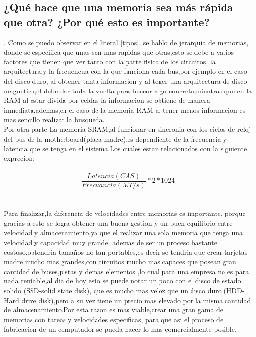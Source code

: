 \documentclass{article}
\begin{document}
\subsection{¿Qué hace que una memoria sea más rápida que otra? ¿Por qué esto es importante?}.\label{comparacion}
Como se puedo observar en el literal \ref{tipos}, se hablo de jerarquia de memorias, donde se especifica que unas son mas rapidas que otras,esto se debe a varios factores que tienen que ver  tanto con la parte fisica de los circuitos, la  arquitectura,y la frecuencua con la que funciona cada bus,por ejemplo en el caso del disco duro, al obtener tanta informacion y al tener una arquitectura de disco magnetico,el debe dar toda la vuelta para buscar algo concreto,mientras que en la RAM al estar divida por celdas la informacion se obtiene de manera inmediata,ademas,en el caso de la memoria RAM al tener menos informacion es mas sencillo realizar la busqueda.\\

Por otra parte La memoria SRAM,al funcionar en sincronia con los ciclos de reloj del bus de la motherboard(placa madre),es dependiente de la frecuencia y latencia que se tenga en el sistema.Los cuales estan relacionados con la siguiente exprecion:\\\\

\begin{equation}
\frac{Latencia(CAS)}{Frecuancia(MT/s)}*2*1024 
\label{eq}
\end{equation}
\\\\
Para finalizar,la diferencia de velocidades entre memorias es importante, porque gracias a esto se logra obtener una buena gestion y un buen equilibrio entre velocidad y almacenamiento,ya que el realizar una sola memoria que tenga una velocidad y capacidad muy grande, ademas de ser un proceso bastante costoso,obtendria tamaños no tan portables,es decir se tendria que crear tarjetas madre mucho mas grandes,con circuitos mucho mas capaces que posean gran cantidad de buses,pistas y demas elementos ,lo cual para una empresa no es para nada rentable,al dia de hoy esto se puede notar un poco con el disco de estado solido (SSD-solid state disk), que es mucho mas veloz que un disco duro (HDD-Hard drive disk),pero a su vez tiene un precio mas elevado por la misma cantidad de almacenamiento.Por esta razon es mas viable,crear una gran gama de memorias con tareas y velocidades especificas, para que asi el proceso de fabricacion de un computador se pueda hacer lo mas comercialmente posible.
\end{document}
